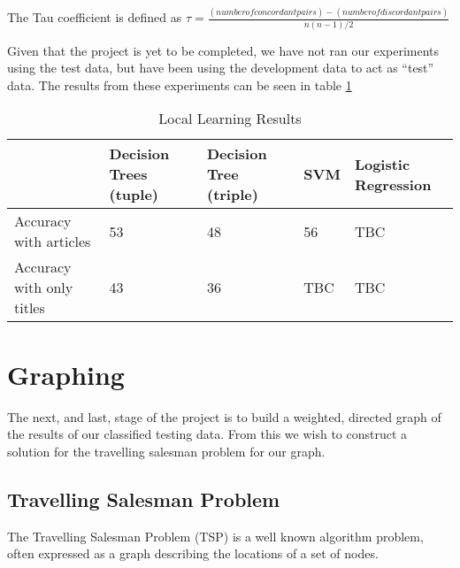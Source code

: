 \documentclass[12pt]{report}
\begin{document}
The Tau coefficient is defined as $\tau = \frac{(number of concordant pairs) - (number of discordant pairs)}{n(n-1)/2}$\cite{kendalltau}%

Given that the project is yet to be completed, we have not ran our experiments using the test data, but have been using
the development data to act as ``test'' data. The results from these experiments can be seen in table \ref{table:local-learning}

\begin{table}[h]
\centering
\label{table:local-learning}
\begin{tabular}{|l|l|l|l|l}
  \hline
                          & Decision Trees (tuple) & Decision Tree (triple) & SVM  & Logistic Regression\\
  \hline
Accuracy with articles    & 53                      & 48                      & 56 &  TBC\\
\hline
Accuracy with only titles & 43                      & 36                      & TBC    & TBC\\
\hline
\end{tabular}
\caption{Local Learning Results}
\end{table}



\chapter{Graphing}
The next, and last, stage of the project is to build a weighted, directed graph of the
results of our classified testing data. From this we wish to construct a solution for
the travelling salesman problem for our graph.

\section{Travelling Salesman Problem}
The Travelling Salesman Problem (TSP) is a well known algorithm problem, often expressed as a graph
describing the locations of a set of nodes.
\end{document}
